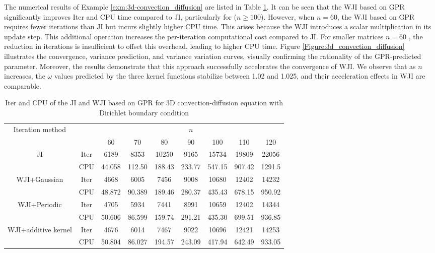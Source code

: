 \documentclass[preprint,review,sort&compress,3p]{elsarticle}
\begin{document}
The numerical results of Example \ref{exm:3d-convection_diffusion} are listed in Table \ref{Tab:3d_convection_diffusion}. It can be seen that the WJI based on GPR significantly improves Iter and CPU time compared to JI, particularly for ($n \geq 100$). However, when $n = 60$, {  the WJI based on GPR} requires fewer iterations than JI but incurs slightly higher CPU time. This arises because the WJI introduces a scalar multiplication in its update step. This additional operation increases the per-iteration computational cost compared to JI. For smaller matrices $ n = 60$ , the reduction in iterations is insufficient to offset this overhead, leading to higher CPU time.
Figure \ref{Figure:3d_convection_diffusion} illustrates the convergence, variance prediction, and variance variation curves, visually confirming {  the rationality of the GPR-predicted parameter. Moreover, the results demonstrate that this approach successfully accelerates the convergence of WJI. We observe that as $n$ increases, the $\omega$ values predicted by the three kernel functions stabilize between 1.02 and 1.025, and their acceleration effects in WJI are comparable.}



\begin{table}[htbp!]
	\caption{Iter and CPU of the JI and WJI based on GPR for {  3D convection-diffusion equation with Dirichlet boundary condition} }
	\label{Tab:3d_convection_diffusion}
	\centering
	\begin{tabular}{ccccccccc}
		\hline
		\multirow{2}{*}{Iteration method} &     & \multicolumn{7}{c}{$n$}           \\
		\cline{3-9} 
		&     & 60    & 70   & 80 & 90  & 100 & 110 & 120 \\ 
		\hline
		\multirow{2}{*}{JI}           & Iter  &  6189 & 8353  & 10250 & 9165 &15734 & 19809 &  22056\\
		\cline{2-9} 
		& CPU & 44.058   & 112.50    &   188.43   & 233.77  &  547.15 &907.42 & 1291.5 \\  \hline
		\multirow{2}{*}{  WJI+Gaussian}         & Iter  & 4668   & 6005  & 7456   & 9008 &  10680 &12402 &14232 \\ 
		\cline{2-9} 
		& CPU &  48.872 &  90.389 & 189.46 &  280.37  & 435.43 &678.15 & 950.92 \\ 
		\hline
		\multirow{2}{*}{  WJI+Periodic}         & Iter  &  4705   &  5934 &  7441  &  8991  & 10659 &12402 &14344 \\ 
		\cline{2-9} 
		& CPU & 50.606 & 86.599 & 159.74 & 291.21 & 435.30 & 699.51& 936.85 \\ 
		\hline
		\multirow{2}{*}{  WJI+additive kernel}         & Iter  & 4676  &  6014  & 7467  &  9022 & 10696 & 12421 &14253 \\ 
		\cline{2-9} 
		& CPU & 50.804 & 86.027 & 194.57 & 243.09 & 417.94 & 642.49 & 933.05 \\ 
		\hline
	\end{tabular}
\end{table}
\end{document}
